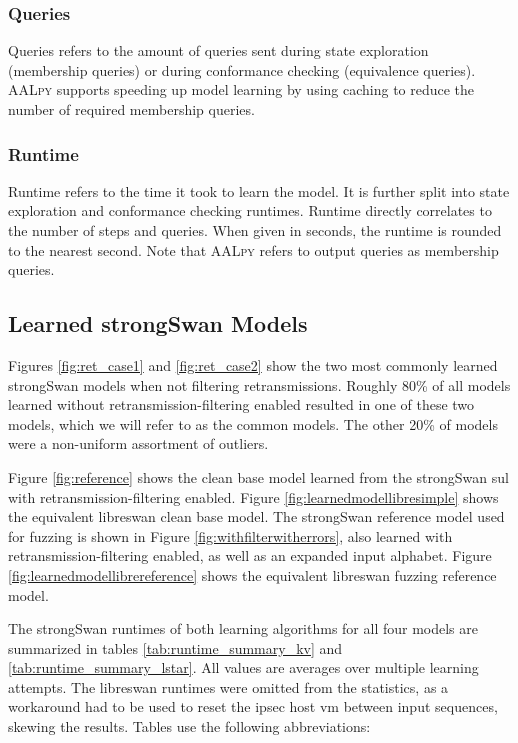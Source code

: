\subsubsection*{Queries}
Queries refers to the amount of queries sent during state exploration (membership queries) or during conformance checking (equivalence queries). \textsc{AALpy} supports speeding up model learning by using caching to reduce the number of required membership queries. 

\subsubsection*{Runtime}
Runtime refers to the time it took to learn the model. It is further split into state exploration and conformance checking runtimes. Runtime directly correlates to the number of steps and queries. When given in seconds, the runtime is rounded to the nearest second. Note that \textsc{AALpy} refers to output queries as membership queries.


\subsection{Learned strongSwan Models} \label{subsec:models}
Figures \ref{fig:ret_case1} and \ref{fig:ret_case2} show the two most commonly learned strongSwan models when not filtering retransmissions. Roughly 80\% of all models learned without retransmission-filtering enabled resulted in one of these two models, which we will refer to as the common models. The other 20\% of models were a non-uniform assortment of outliers. 

Figure \ref{fig:reference} shows the clean base model learned from the strongSwan \ac{sul} with retransmission-filtering enabled. Figure \ref{fig:learnedmodellibresimple} shows the equivalent libreswan clean base model. The strongSwan reference model used for fuzzing is shown in Figure \ref{fig:withfilterwitherrors}, also learned with retransmission-filtering enabled, as well as an expanded input alphabet. Figure \ref{fig:learnedmodellibrereference} shows the equivalent libreswan fuzzing reference model.

The strongSwan runtimes of both learning algorithms for all four models are summarized in tables \ref{tab:runtime_summary_kv} and \ref{tab:runtime_summary_lstar}. All values are averages over multiple learning attempts. The libreswan runtimes were omitted from the statistics, as a workaround had to be used to reset the \ac{ipsec} host \ac{vm} between input sequences, skewing the results. Tables use the following abbreviations:

